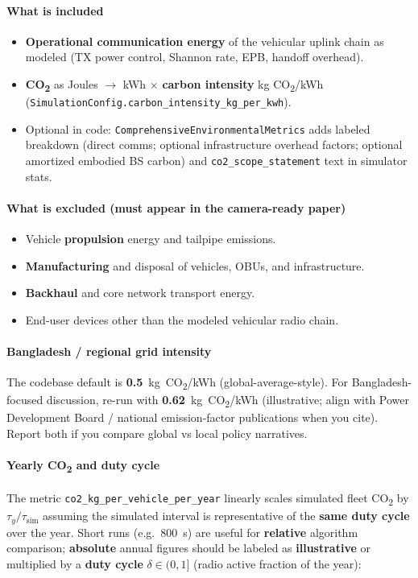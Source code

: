 \documentclass[conference]{IEEEtran}
\begin{document}
\paragraph*{What is included}
\begin{itemize}
\item \textbf{Operational communication energy} of the vehicular uplink chain as modeled (TX power control, Shannon rate, EPB, handoff overhead).
\item \textbf{CO\textsubscript{2}} as Joules $\rightarrow$ kWh $\times$ \textbf{carbon intensity} kg CO\textsubscript{2}/kWh (\texttt{SimulationConfig.carbon\_intensity\_kg\_per\_kwh}).
\item Optional in code: \texttt{ComprehensiveEnvironmentalMetrics} adds labeled breakdown (direct comms; optional infrastructure overhead factors; optional amortized embodied BS carbon) and \texttt{co2\_scope\_statement} text in simulator stats.
\end{itemize}

\paragraph*{What is excluded (must appear in the camera-ready paper)}
\begin{itemize}
\item Vehicle \textbf{propulsion} energy and tailpipe emissions.
\item \textbf{Manufacturing} and disposal of vehicles, OBUs, and infrastructure.
\item \textbf{Backhaul} and core network transport energy.
\item End-user devices other than the modeled vehicular radio chain.
\end{itemize}

\paragraph*{Bangladesh / regional grid intensity}
The codebase default is \textbf{0.5}~kg~CO\textsubscript{2}/kWh (global-average-style). For Bangladesh-focused discussion, re-run with \textbf{0.62}~kg~CO\textsubscript{2}/kWh (illustrative; align with Power Development Board / national emission-factor publications when you cite). Report both if you compare global vs local policy narratives.

\paragraph*{Yearly CO\textsubscript{2} and duty cycle}
The metric \texttt{co2\_kg\_per\_vehicle\_per\_year} linearly scales simulated fleet CO\textsubscript{2} by $\tau_y/\tau_{\mathrm{sim}}$ assuming the simulated interval is representative of the \textbf{same duty cycle} over the year. Short runs (e.g.\ 800~s) are useful for \textbf{relative} algorithm comparison; \textbf{absolute} annual figures should be labeled as \textbf{illustrative} or multiplied by a \textbf{duty cycle} $\delta\in(0,1]$ (radio active fraction of the year):
\end{document}
